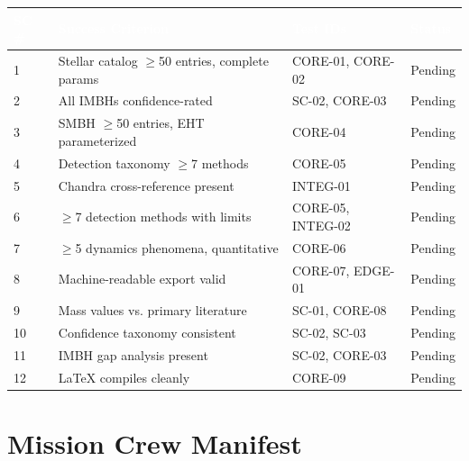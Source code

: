 \documentclass[11pt,letterpaper]{article}
\newcommand{\tableheader}[1]{\textbf{\sffamily\textcolor{white}{#1}}}
\begin{document}
\begin{center}
\begin{tabularx}{\textwidth}{C{1cm}L{5cm}L{3cm}C{2cm}}
\toprule
{}
\tableheader{SC \#} & \tableheader{Success Criterion} & \tableheader{Test IDs} & \tableheader{Status} \\
 & Stellar catalog $\geq$50 entries, complete params & CORE-01, CORE-02 & Pending \\
2 & All IMBHs confidence-rated & SC-02, CORE-03 & Pending \\
3 & SMBH $\geq$50 entries, EHT parameterized & CORE-04 & Pending \\
4 & Detection taxonomy $\geq$7 methods & CORE-05 & Pending \\
5 & Chandra cross-reference present & INTEG-01 & Pending \\
6 & $\geq$7 detection methods with limits & CORE-05, INTEG-02 & Pending \\
7 & $\geq$5 dynamics phenomena, quantitative & CORE-06 & Pending \\
8 & Machine-readable export valid & CORE-07, EDGE-01 & Pending \\
9 & Mass values vs. primary literature & SC-01, CORE-08 & Pending \\
10 & Confidence taxonomy consistent & SC-02, SC-03 & Pending \\
11 & IMBH gap analysis present & SC-02, CORE-03 & Pending \\
12 & LaTeX compiles cleanly & CORE-09 & Pending \\
\bottomrule
\end{tabularx}
\end{center}

\section{Mission Crew Manifest}
\end{document}
